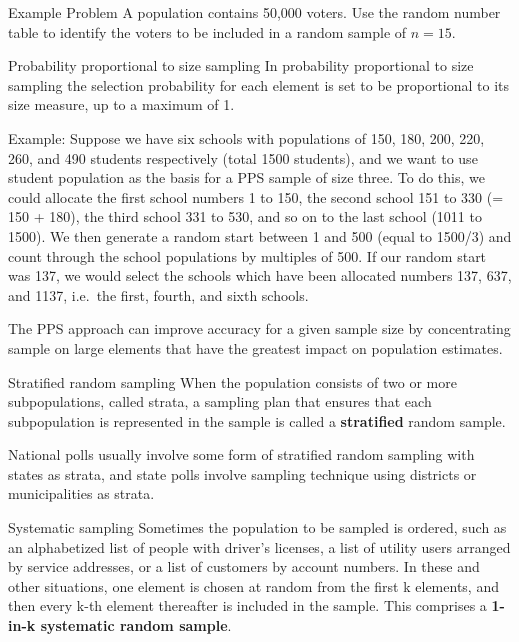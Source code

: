 \documentclass[
  ignorenonframetext,
  aspectratio=169]{beamer}
\begin{document}
\begin{frame}{Example Problem}
\protect\hypertarget{example-problem}{}
A population contains 50,000 voters. Use the random number table to
identify the voters to be included in a random sample of \(n=15\).
\end{frame}

\begin{frame}{Probability proportional to size sampling}
\protect\hypertarget{probability-proportional-to-size-sampling}{}
In probability proportional to size sampling the selection probability
for each element is set to be proportional to its size measure, up to a
maximum of 1.

Example: Suppose we have six schools with populations of 150, 180, 200,
220, 260, and 490 students respectively (total 1500 students), and we
want to use student population as the basis for a PPS sample of size
three. To do this, we could allocate the first school numbers 1 to 150,
the second school 151 to 330 (= 150 + 180), the third school 331 to 530,
and so on to the last school (1011 to 1500). We then generate a random
start between 1 and 500 (equal to 1500/3) and count through the school
populations by multiples of 500. If our random start was 137, we would
select the schools which have been allocated numbers 137, 637, and 1137,
i.e.~the first, fourth, and sixth schools.

The PPS approach can improve accuracy for a given sample size by
concentrating sample on large elements that have the greatest impact on
population estimates.
\end{frame}

\begin{frame}{Stratified random sampling}
\protect\hypertarget{stratified-random-sampling}{}
When the population consists of two or more subpopulations, called
strata, a sampling plan that ensures that each subpopulation is
represented in the sample is called a \textbf{stratified} random sample.

National polls usually involve some form of stratified random sampling
with states as strata, and state polls involve sampling technique using
districts or municipalities as strata.
\end{frame}

\begin{frame}{Systematic sampling}
\protect\hypertarget{systematic-sampling}{}
Sometimes the population to be sampled is ordered, such as an
alphabetized list of people with driver's licenses, a list of utility
users arranged by service addresses, or a list of customers by account
numbers. In these and other situations, one element is chosen at random
from the first k elements, and then every k-th element thereafter is
included in the sample. This comprises a \textbf{1-in-k systematic
random sample}.
\end{frame}
\end{document}
